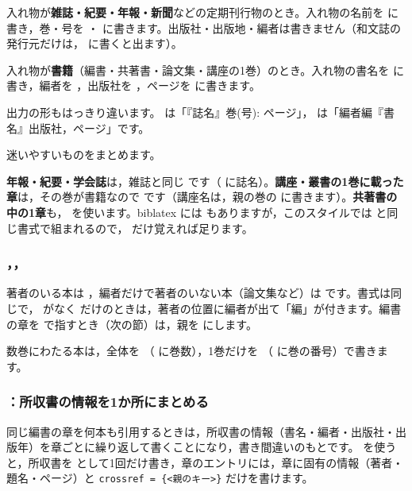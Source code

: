 \begin{keymarglist}
\item[article]
入れ物が\textbf{雑誌・紀要・年報・新聞}などの定期刊行物のとき。入れ物の名前を  に書き，巻・号を ・ に書きます。出版社・出版地・編者は書きません（和文誌の発行元だけは， に書くと出ます）。

\item[incollection]
入れ物が\textbf{書籍}（編書・共著書・論文集・講座の1巻）のとき。入れ物の書名を  に書き，編者を ，出版社を ，ページを  に書きます。
\end{keymarglist}

出力の形もはっきり違います。 は「『誌名』巻(号): ページ」， は「編者編『書名』出版社，ページ」です。


\begin{caution}
迷いやすいものをまとめます。

\textbf{年報・紀要・学会誌}は，雑誌と同じ  です（ に誌名）。\textbf{講座・叢書の1巻に載った章}は，その巻が書籍なので  です（講座名は，親の巻の  に書きます）。\textbf{共著書の中の1章}も， を使います。biblatex には  もありますが，このスタイルでは  と同じ書式で組まれるので， だけ覚えれば足ります。
\end{caution}

\subsubsection{，，}
著者のいる本は ，編者だけで著者のいない本（論文集など）は  です。書式は同じで， がなく  だけのときは，著者の位置に編者が出て「編」が付きます。編書の章を  で指すとき（次の節）は，親を  にします。

数巻にわたる本は，全体を （ に巻数），1巻だけを （ に巻の番号）で書きます。

\subsubsection{：所収書の情報を1か所にまとめる}\label{sec:crossref}
同じ編書の章を何本も引用するときは，所収書の情報（書名・編者・出版社・出版年）を章ごとに繰り返して書くことになり，書き間違いのもとです。 を使うと，所収書を  として1回だけ書き，章のエントリには，章に固有の情報（著者・題名・ページ）と \texttt{crossref = \{<親のキー>\}} だけを書けます。

